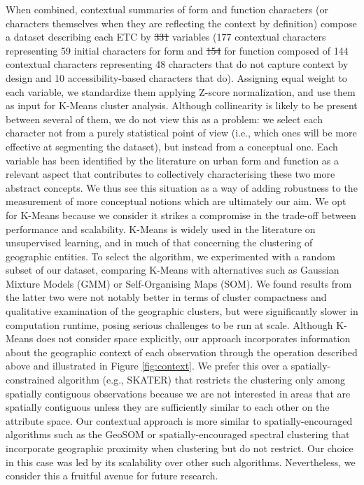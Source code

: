 \documentclass[fleqn,10pt]{wlscirep}
\providecommand{\DIFadd}[1]{{\protect\color{blue}\uwave{#1}}} %
\providecommand{\DIFdel}[1]{{\protect\color{red}\sout{#1}}}                      %
\providecommand{\DIFaddbegin}{} %
\providecommand{\DIFaddend}{} %
\providecommand{\DIFdelbegin}{} %
\providecommand{\DIFdelend}{} %
\begin{document}

When combined, contextual summaries of form and function characters (or characters
themselves when they are reflecting the context by definition) compose a dataset
describing each ETC by \DIFdelbegin \DIFdel{331 }\DIFdelend \DIFaddbegin \DIFadd{328 }\DIFaddend variables (177 contextual characters representing 59 initial
characters for form and \DIFdelbegin \DIFdel{154 }\DIFdelend \DIFaddbegin \DIFadd{151 }\DIFaddend for function composed of 144 contextual characters
representing 48 characters that do not capture context by design and 10
accessibility-based characters that do).
Assigning equal weight to each variable, we standardize them applying
Z-score normalization, and use them as input for K-Means cluster analysis.
Although collinearity is likely to be present between several of them, we do
not view this as a problem: we select each character not from a purely
statistical point of view (i.e., which ones will be more effective at
segmenting the dataset), but instead from a conceptual one. Each variable has
been identified by the literature on urban form and function as a relevant
aspect that contributes to collectively characterising these two more abstract
concepts. We thus see this situation as a way of adding robustness to the
measurement of more conceptual notions which are ultimately our aim.
We opt for K-Means because we consider it strikes a compromise in
the trade-off between performance and scalability. K-Means is widely used in the literature on
unsupervised learning, and in much of that concerning the clustering of
geographic entities\cite{webber2018predictive}.
To select the algorithm, we experimented with a random subset of our dataset,
comparing K-Means with alternatives such as Gaussian
Mixture Models (GMM) or Self-Organising Maps (SOM). We found results from the
latter two were not notably better in terms of cluster compactness and qualitative examination
of the geographic clusters, but were significantly slower in computation
runtime, posing serious challenges to be run at scale.
Although K-Means does not consider space explicitly, our approach incorporates
information about the geographic context of each observation through the
operation described above and illustrated in Figure \ref{fig:context}. We
prefer this over a spatially-constrained algorithm (e.g.,
SKATER\cite{lage2001minimal}) that restricts the clustering only among spatially contiguous observations
because we are not interested in areas that are spatially contiguous unless
they are sufficiently similar to each other on the attribute space. Our
contextual approach is more similar to spatially-encouraged algorithms such as the
GeoSOM\cite{baccao2005self} or spatially-encouraged spectral clustering\cite{wolf2021spatially} that incorporate geographic proximity when
clustering but do not restrict. Our choice in this case was led by its
scalability over other such algorithms.
Nevertheless, we consider this a fruitful avenue for future research.
\end{document}
